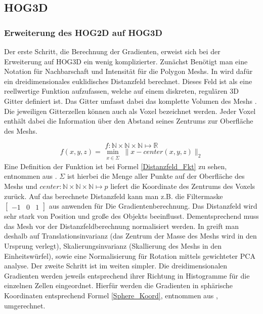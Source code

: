 \subsection{HOG3D}


\subsubsection{Erweiterung des HOG2D auf HOG3D}
Der erste Schritt, die Berechnung der Gradienten, erweist sich bei der Erweiterung auf HOG3D ein wenig komplizierter. Zunächst Benötigt man eine Notation für Nachbarschaft und Intensität für die Polygon Meshs. In \cite{scherer2010histograms} wird dafür ein dreidimensionales euklidisches 
Distanzfeld berechnet. Dieses Feld ist als eine reellwertige Funktion aufzufassen, welche auf einem diskreten, regulären 3D Gitter definiert ist. Das Gitter umfasst dabei das komplette Volumen des Meshs \cite{scherer2010histograms}. Die jeweiligen Gitterzellen können auch als Voxel bezeichnet werden. Jeder Voxel enthält dabei die Information über den Abstand seines Zentrums zur Oberfläche des Meshs. 

\begin{equation*}
f: \mathbb{N} \times \mathbb{N} \times \mathbb{N} \mapsto \mathbb{R} 
\end{equation*}
\begin{equation}
\label{Distanzfeld_Fkt}
f(x,y,z) = \min_{\substack{x \in \Sigma}} \| x-center(x,y,z) \|_2
\end{equation}
Eine Definition der Funktion ist bei Formel \ref{Distanzfeld_Fkt} zu sehen, entnommen aus \cite{scherer2010histograms}. $\Sigma$ ist hierbei die Menge aller Punkte auf der Oberfläche des Meshs und $center: \mathbb{N} \times \mathbb{N} \times \mathbb{N} \mapsto p $ liefert die Koordinate des Zentrums des Voxels zurück.
\newline
Auf das berechnete Distanzfeld kann man z.B. die Filtermaske $\begin{bmatrix} -1 & 0 & 1\end{bmatrix}$ aus \cite{dalal2005histograms} anwenden für Die Gradientenberechnung.
\newline
Das Distanzfeld wird sehr stark von Position und große des Objekts beeinflusst. Dementsprechend muss das Mesh vor der Distanzfeldberechnung normalisiert werden. In \cite{scherer2010histograms} greift man deshalb auf Translationsinvarianz  (das Zentrum der Masse des Meshs wird in den Ursprung verlegt), Skalierungsinvarianz (Skallierung des Meshs in den Einheitswürfel), sowie eine Normalisierung für Rotation mittels gewichteter PCA analyse.
\newline
Der zweite Schritt ist im weiten simpler. Die dreidimensionalen Gradienten werden jeweils entsprechend ihrer Richtung in Histogramme für die einzelnen Zellen eingeordnet. Hierfür werden die Gradienten in sphärische Koordinaten entsprechend Formel \ref{Sphere_Koord}, entnommen aus \cite{scherer2010histograms}, umgerechnet.

